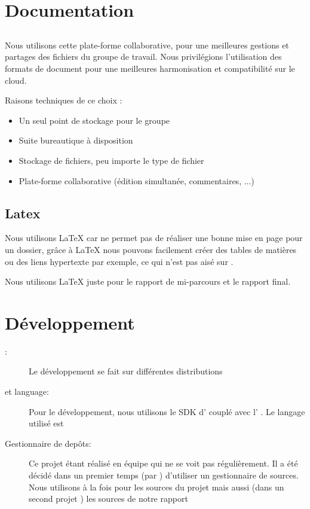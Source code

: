 \section{Documentation}
\subsection{\googleDrive}
Nous utilisons cette plate-forme collaborative, pour une meilleures gestions et partages des fichiers du groupe de travail. Nous privilégions l'utilisation des formats de document \google{} pour une meilleures harmonisation et compatibilité sur le cloud.

Raisons techniques de ce choix :
\begin{itemize}
\item Un seul point de stockage pour le groupe
\item Suite bureautique à disposition
\item Stockage de fichiers, peu importe le type de fichier
\item Plate-forme collaborative (édition simultanée, commentaires, ...)
\end{itemize}

\subsection{Latex}
Nous utilisons \LaTeX{} car \googleDocuments{} ne permet pas de réaliser une bonne mise en page pour un dossier, gr\^{a}ce à \LaTeX{} nous pouvons facilement créer des tables de matières ou des liens hypertexte par exemple, ce qui n'est pas aisé sur \googleDocuments{}.

Nous utilisons \LaTeX{} juste pour le rapport de mi-parcours et le rapport final.

\section{Développement}
\begin{description}
\item[\os{}:] Le développement se fait sur différentes distributions \linux{}
\item[\ide{} et language:] Pour le développement, nous utilisons le SDK d'\android{} couplé avec l'\ide{} \eclipse{}. Le langage utilisé est \java{}
\item[Gestionnaire de depôts:] Ce projet étant réalisé en équipe qui ne se voit pas régulièrement. Il a été décidé dans un premier temps (par \responsableProjet{}) d'utiliser un gestionnaire de sources. Nous utilisons \github{} à la fois pour les sources du projet mais aussi (dans un second projet \github{}) les sources de notre rapport
\end{description}
